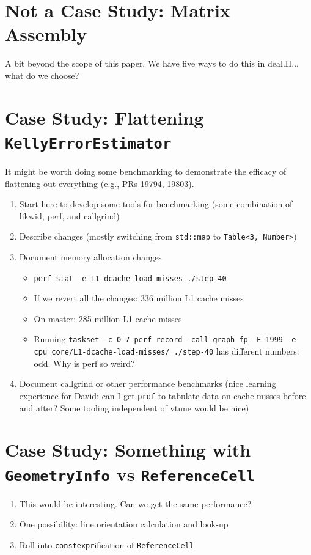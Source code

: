 \documentclass[11pt]{article}
\begin{document}
\section{Not a Case Study: Matrix Assembly}
A bit beyond the scope of this paper. We have five ways to do this in deal.II...
what do we choose?

\section{Case Study: Flattening \texttt{KellyErrorEstimator}}
It might be worth doing some benchmarking to demonstrate the efficacy of
flattening out everything (e.g., PRs 19794, 19803).
\begin{enumerate}
  \item Start here to develop some tools for benchmarking (some combination of
    likwid, perf, and callgrind)

  \item Describe changes (mostly switching from \texttt{std::map} to
    \texttt{Table<3, Number>})

  \item Document memory allocation changes
    \begin{itemize}
      \item \texttt{perf stat -e L1-dcache-load-misses ./step-40}
      \item If we revert all the changes: 336 million L1 cache misses
      \item On master: 285 million L1 cache misses
      \item Running \texttt{taskset -c 0-7 perf record --call-graph fp -F 1999 -e cpu\_core/L1-dcache-load-misses/ ./step-40}
        has different numbers: odd. Why is perf so weird?
    \end{itemize}

  \item Document callgrind or other performance benchmarks (nice learning
    experience for David: can I get \texttt{prof} to tabulate data on cache
    misses before and after? Some tooling independent of vtune would be nice)
\end{enumerate}

\section{Case Study: Something with \texttt{GeometryInfo} vs \texttt{ReferenceCell}}
\begin{enumerate}
  \item This would be interesting. Can we get the same performance?

  \item One possibility: line orientation calculation and look-up

  \item Roll into \texttt{constexpr}ification of \texttt{ReferenceCell}
\end{enumerate}
\end{document}
